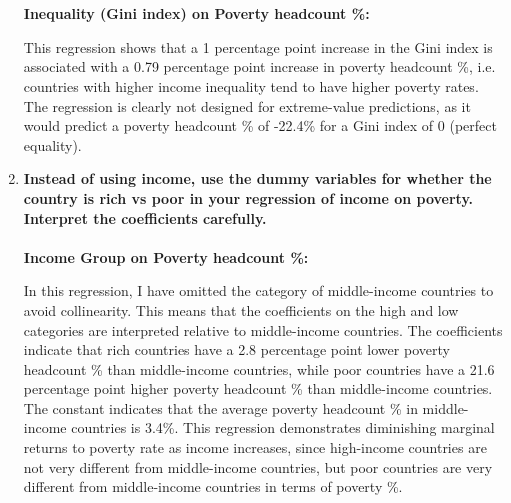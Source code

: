 \documentclass[12pt]{article}
\begin{document}
\begin{enumerate}
    \\\\
    \textbf{Inequality (Gini index) on Poverty headcount \%:}
    \footnotesize
    
    \normalsize
    This regression shows that a 1 percentage point increase in the Gini index is associated with a 0.79 percentage point increase in poverty headcount \%, i.e. countries with higher income inequality tend to have higher poverty rates. The regression is clearly not designed for extreme-value predictions, as it would predict a poverty headcount \% of -22.4\% for a Gini index of 0 (perfect equality).

    \item \textbf{Instead of using income, use the dummy variables for whether the country is rich vs poor in your regression of income on poverty. Interpret the coefficients carefully.}
    \\\\
    \textbf{Income Group on Poverty headcount \%:}
    \footnotesize
    
    \normalsize
    In this regression, I have omitted the category of middle-income countries to avoid collinearity. This means that the coefficients on the high and low categories are interpreted relative to middle-income countries. The coefficients indicate that rich countries have a 2.8 percentage point lower poverty headcount \% than middle-income countries, while poor countries have a 21.6 percentage point higher poverty headcount \% than middle-income countries. The constant indicates that the average poverty headcount \% in middle-income countries is 3.4\%. This regression demonstrates diminishing marginal returns to poverty rate as income increases, since high-income countries are not very different from middle-income countries, but poor countries are very different from middle-income countries in terms of poverty \%.



\end{enumerate}
\end{document}

